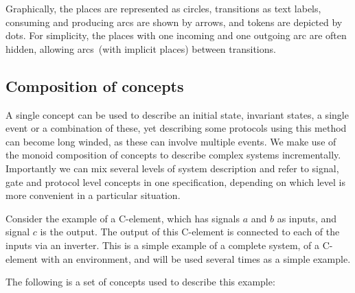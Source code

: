\documentclass[british,compsoc]{IEEEtran}
\begin{document}
Graphically, the places are represented as circles, transitions as
text labels, consuming and producing arcs are shown by arrows, and
tokens are depicted by dots. For simplicity, the places with one incoming
and one outgoing arc are often hidden, allowing arcs~(with implicit
places) between transitions.


\subsection{Composition of concepts\label{sub:Comp-of-concepts}}



A single concept can be used to describe an initial state, invariant
states, a single event or a combination of these, yet describing some
protocols using this method can become long winded, as these can involve
multiple events. We make use of the monoid composition of concepts
to describe complex systems incrementally. Importantly we can mix
several levels of system description and refer to signal, gate and
protocol level concepts in one specification, depending on which level
is more convenient in a particular situation.

Consider the example of a C-element, which has signals $a$ and $b$ as inputs,
and signal $c$ is the output. The output of this C-element is connected to
each of the inputs via an inverter. This is a simple example of a complete
system, of a C-element with an environment, and will be used several
times as a simple example.

The following is a set of concepts used to describe this example:
\end{document}
